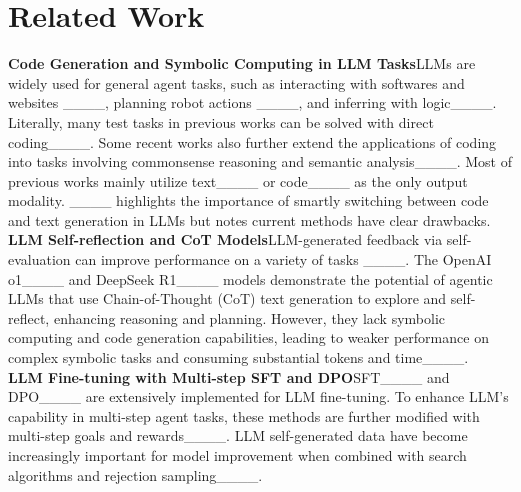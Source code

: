 \section{Related Work}
\label{sec: Related Work}
\textbf{Code Generation and Symbolic Computing in LLM Tasks}\quad LLMs are widely used for general agent tasks, such as interacting with softwares and websites ____, planning robot actions ____, and inferring with logic____. Literally, many test tasks in previous works can be solved with direct coding____. Some recent works also further extend the applications of coding into tasks involving commonsense reasoning and semantic analysis____. Most of previous works mainly utilize text____ or code____ as the only output modality. ____ highlights the importance of smartly switching between code and text generation in LLMs but notes current methods have clear drawbacks.\\
\textbf{LLM Self-reflection and CoT Models}\quad LLM-generated feedback via self-evaluation can improve performance on a variety of tasks ____. The OpenAI o1____ and DeepSeek R1____ models demonstrate the potential of agentic LLMs that use Chain-of-Thought (CoT) text generation to explore and self-reflect, enhancing reasoning and planning. However, they lack symbolic computing and code generation capabilities, leading to weaker performance on complex symbolic tasks and consuming substantial tokens and time____.\\
\textbf{LLM Fine-tuning with Multi-step SFT and DPO}\quad SFT____ and DPO____ are extensively implemented for LLM fine-tuning. To enhance LLM's capability in multi-step agent tasks, these methods are further modified with multi-step goals and rewards____. LLM self-generated data have become increasingly important for model improvement when combined with search algorithms and rejection sampling____.